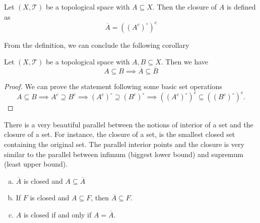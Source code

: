 \begin{definition}
	Let $(X,\mathcal{T})$ be a topological space with $A \subseteq X$. Then the closure of $A$ is defined as
	\[ \overline{A} = ((A^c)^\circ)^c \]
\end{definition}

From the definition, we can conclude the following corollary
\begin{corollary}
	Let $(X,\mathcal{T})$ be a topological space with $A,B \subseteq X$. Then we have
	\[ A \subseteq B \implies \overline{A} \subseteq \overline{B} \]
\end{corollary}
\begin{proof}
	We can prove the statement following some basic set operations
	\[ A \subseteq B \implies A^c \supseteq B^c \implies (A^c)^\circ \supseteq (B^c)^\circ \implies ((A^c)^\circ)^c \subseteq ((B^c)^\circ)^c. \]
\end{proof}

There is a very beautiful parallel between the notions of interior of a set and the closure of a set. For instance, the closure of a set, is the smallest closed set containing the original set. The parallel interior points and the closure is very similar to the parallel between infimum (biggest lower bound) and supremum (least upper bound).

\begin{proposition}
	\begin{enumerate}[(a)]
		\item $\overline{A}$ is closed and $A \subseteq \overline{A}$
		\item If $F$ is closed and $A \subseteq F$, then $\overline{A} \subseteq F$.
		\item $A$ is closed if and only if $A = \overline{A}$.
	\end{enumerate}
\end{proposition}

